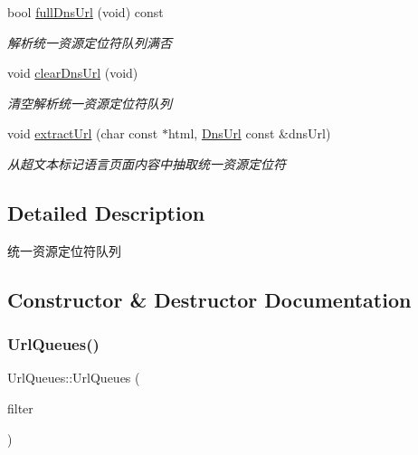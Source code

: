 \begin{DoxyCompactItemize}
bool \hyperlink{class_url_queues_a60ae6e63c4dcd998e0adfa9edf530509}{full\+Dns\+Url} (void) const
\begin{DoxyCompactList}\small\item\em 解析统一资源定位符队列满否 \end{DoxyCompactList}\item 
\mbox{\label{class_url_queues_a136b3156b923cb0ceb7ef8577fd71d4f}} 
void \hyperlink{class_url_queues_a136b3156b923cb0ceb7ef8577fd71d4f}{clear\+Dns\+Url} (void)
\begin{DoxyCompactList}\small\item\em 清空解析统一资源定位符队列 \end{DoxyCompactList}\item 
void \hyperlink{class_url_queues_a1f82f08afb7279075f3bef674b383bf4}{extract\+Url} (char const $\ast$html, \hyperlink{class_dns_url}{Dns\+Url} const \&dns\+Url)
\begin{DoxyCompactList}\small\item\em 从超文本标记语言页面内容中抽取统一资源定位符 \end{DoxyCompactList}\end{DoxyCompactItemize}


\subsection{Detailed Description}
统一资源定位符队列 

\subsection{Constructor \& Destructor Documentation}
\mbox{\label{class_url_queues_a9761fc84cfd4bf6188a73229873fafd5}} 
\subsubsection{\texorpdfstring{Url\+Queues()}{UrlQueues()}}
{\footnotesize\ttfamily Url\+Queues\+::\+Url\+Queues (\begin{DoxyParamCaption}\item[{\hyperlink{class_url_filter}{Url\+Filter} \&}]{filter }\end{DoxyParamCaption})}



